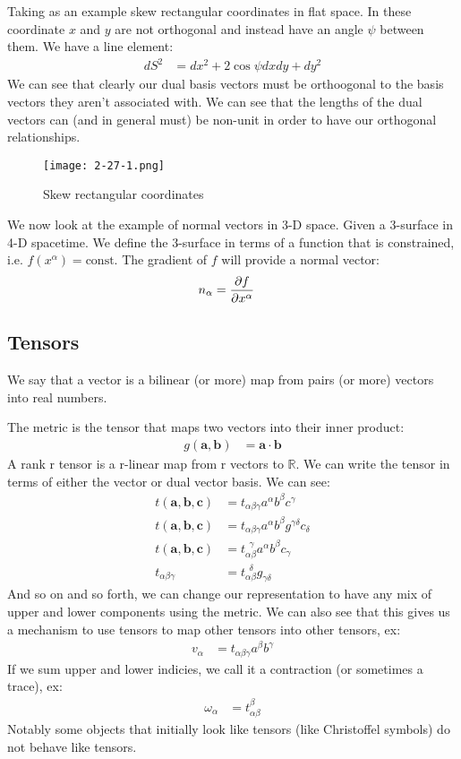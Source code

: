 Taking as an example skew rectangular coordinates in flat space. In these coordinate $x$ and $y$ are not orthogonal and instead have an angle $\psi$ between them. We have a line element:
\begin{align*}
	dS^2 &= dx^2 + 2\cos\psi dxdy + dy^2
\end{align*}
We can see that clearly our dual basis vectors must be orthoogonal to the basis vectors they aren't associated with.
We can see that the lengths of the dual vectors can (and in general must) be non-unit in order to have our orthogonal relationships.
\begin{figure*}[h]
	\centering
	\texttt{[image: 2-27-1.png]}
	\caption*{Skew rectangular coordinates}
\end{figure*}

We now look at the example of normal vectors in 3-D space. Given a 3-surface in 4-D spacetime. 
We define the 3-surface in  terms of a function that is constrained, i.e. $f(x^\alpha) =\text{const}$. The gradient of $f$ will provide a normal vector:
\begin{align*}
	n_\alpha &= \frac{\partial f}{\partial x^\alpha}
\end{align*}
\subsection{Tensors}
We say that a vector is a bilinear (or more) map from pairs (or more) vectors into real numbers.

The metric is the tensor that maps two vectors into their inner product:
\begin{align*}
	g(\bm{a},\bm{b}) &= \bm{a}\cdot\bm{b}
\end{align*}
A rank r tensor is a r-linear map from r vectors to $\mathbb{R}$. We can write the tensor in terms of either the vector or dual vector basis. We can see:
\begin{align*}
	t(\bm{a},\bm{b},\bm{c}) &= t_{\alpha\beta\gamma} a^\alpha b^\beta c^\gamma \\
	t(\bm{a},\bm{b},\bm{c}) &= t_{\alpha\beta\gamma} a^\alpha b^\beta g^{\gamma\delta}c_\delta \\
	t(\bm{a},\bm{b},\bm{c}) &= t_{\alpha\beta}^{\ \ \gamma} a^\alpha b^\beta c_\gamma \\
	t_{\alpha\beta\gamma} &= t_{\alpha\beta}^{\ \ \delta}g_{\gamma\delta}
\end{align*}
And so on and so forth, we can change our representation to have any mix of upper and lower components using the metric.
We can also see that this gives us a mechanism to use tensors to map other tensors into other tensors, ex:
\begin{align*}
	v_\alpha &= t_{\alpha\beta\gamma} a^\beta b^\gamma
\end{align*}
If we sum upper and lower indicies, we call it a contraction (or sometimes a trace), ex:
\begin{align*}
	\omega_\alpha &= t_{\alpha\beta}^\beta
\end{align*}
Notably some objects that initially look like tensors (like Christoffel symbols) do not behave like tensors.
